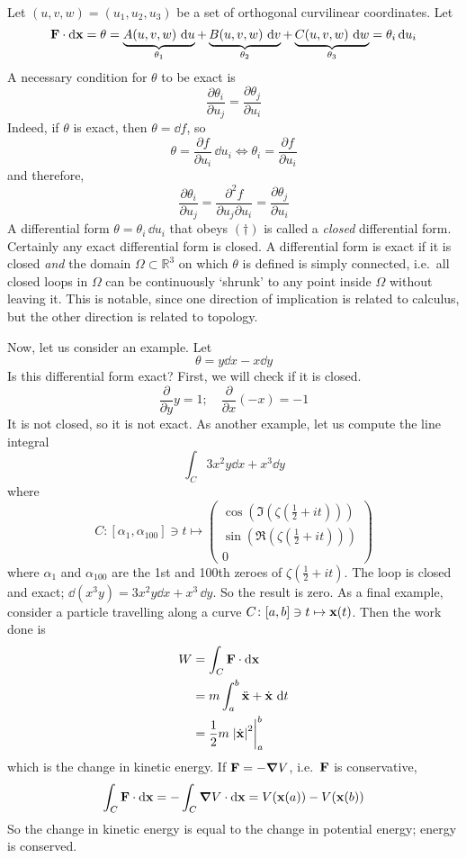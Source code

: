Let \((u, v, w) = (u_1, u_2, u_3)\) be a set of orthogonal curvilinear coordinates. Let
\[ \vb F \cdot \dd \vb x = \theta = \underbrace{A(u, v, w) \, \dd{u}}_{\theta_1} + \underbrace{B(u, v, w) \, \dd{v}}_{\theta_2} + \underbrace{C(u, v, w) \, \dd{w}}_{\theta_3} = \theta_i \dd{u}_i \]
A necessary condition for \(\theta\) to be exact is
\begin{equation}
	\frac{\partial \theta_i}{\partial u_j} = \frac{\partial \theta_j}{\partial u_i}
	\tag{\(\dagger\)}
\end{equation}
Indeed, if \(\theta\) is exact, then \(\theta = \dd{f}\), so
\[ \theta = \frac{\partial f}{\partial u_i} \, \dd{u}_i \iff \theta_i = \frac{\partial f}{\partial u_i} \]
and therefore,
\[ \frac{\partial \theta_i}{\partial u_j} = \frac{\partial^2 f}{\partial u_j \partial u_i} = \frac{\partial \theta_j}{\partial u_i} \]
A differential form \(\theta = \theta_i \, \dd{u}_i\) that obeys \((\dagger)\) is called a \textit{closed} differential form. Certainly any exact differential form is closed. A differential form is exact if it is closed \textit{and} the domain \(\Omega \subset \mathbb R^3\) on which \(\theta\) is defined is simply connected, i.e.\ all closed loops in \(\Omega\) can be continuously `shrunk' to any point inside \(\Omega\) without leaving it. This is notable, since one direction of implication is related to calculus, but the other direction is related to topology.

Now, let us consider an example. Let
\[ \theta = y \dd{x} - x \dd{y} \]
Is this differential form exact? First, we will check if it is closed.
\[ \frac{\partial}{\partial y} y = 1;\quad \frac{\partial}{\partial x} (-x) = -1 \]
It is not closed, so it is not exact. As another example, let us compute the line integral
\[ \int_C 3x^2y\dd{x} + x^3\dd{y} \]
where
\[ C \colon [\alpha_1, \alpha_{100}] \ni t \mapsto \begin{pmatrix}
		\cos \left( \Im \left( \zeta \left( \frac{1}{2} + it \right) \right) \right) \\
		\sin \left( \Re \left( \zeta \left( \frac{1}{2} + it \right) \right) \right) \\
		0
	\end{pmatrix} \]
where \(\alpha_1\) and \(\alpha_{100}\) are the 1st and 100th zeroes of \(\zeta \left( \frac{1}{2} + it \right)\). The loop is closed and exact; \(\dd(x^3 y) = 3x^2 y \dd{x} + x^3 \, \dd{y}\). So the result is zero. As a final example, consider a particle travelling along a curve \(C \colon [a, b] \ni t \mapsto \vb x(t)\). Then the work done is
\begin{align*}
	W & = \int_C \vb F \cdot \dd \vb x                    \\
	  & = m \int_a^b \ddot{\vb x} + \dot{\vb x} \, \dd{t} \\
	  & = \frac{1}{2}m \eval{\abs{\dot{\vb x}}^2}_a^b
\end{align*}
which is the change in kinetic energy. If \(\vb F = -\grad V\), i.e.\ \(\vb F\) is conservative,
\[ \int_C \vb F \cdot \dd \vb x = -\int_C \grad V \cdot \dd \vb x = V(\vb x(a)) - V(\vb x(b)) \]
So the change in kinetic energy is equal to the change in potential energy; energy is conserved.

